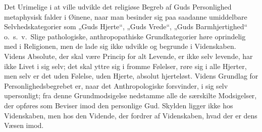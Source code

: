 \documentclass[12pt]{book}
\begin{document}
Det Urimelige i at ville udvikle det religiøse Begreb af Guds
Personlighed metaphysisk falder i Øinene, naar man besinder sig paa
saadanne umiddelbare Selvhedskategorier som „Guds Hjerte“, „Guds
Vrede“, „Guds Barmhjertighed“ o.\ s.\ v.\ Slige pathologiske,
anthropopathiske Grundkategorier høre oprindelig med i Religionen,
men de lade sig ikke udvikle og begrunde i Videnskaben. Videns
Absolute, der skal være Princip for alt Levende, er ikke selv
levende, har ikke Livet i sig selv; det skal yttre sig i fromme
Følelser, røre sig i alle Hjerter, men selv er det uden Følelse,
uden Hjerte, absolut hjerteløst. Videns Grundlag for
Personlighedsbegrebet er, naar det Anthropologiske forsvinder, i sig
selv upersonligt; fra denne Grundmodsigelse nedstamme alle de
særskilte Modsigelser, der opføres som Beviser imod den personlige
Gud. Skylden ligger ikke hos Videnskaben, men hos den Vidende, der
fordrer af Videnskaben, hvad der er dens Væsen imod.
\end{document}
